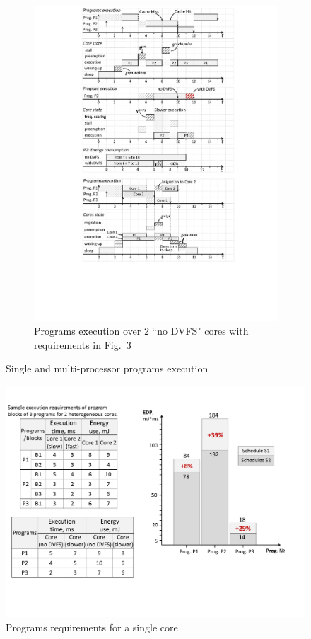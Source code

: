 \begin{figure}
\begin{minipage}{.75\columnwidth}
\begin{subfigure}[t]{\linewidth}
\includegraphics[width=\linewidth]{figs/multiprocessorExecutionExample.pdf}
\caption{Programs execution over 2 ``no DVFS" cores with requirements in Fig.~\ref{fig:singleProcessorExampleRequirements}}
\vspace{3mm}
\label{fig:multiprocessorExecutionExample}
\end{subfigure}
\end{minipage}

\caption{Single and multi-processor programs execution}
\label{fig:singleProcessorCase}
\quad
\end{figure}

\begin{figure}
\centering
\includegraphics[width=.65\linewidth]{figs/singleProcessorExampleRequirements.pdf}
\caption{Programs requirements for a single core}
\label{fig:singleProcessorExampleRequirements}
\end{figure}


